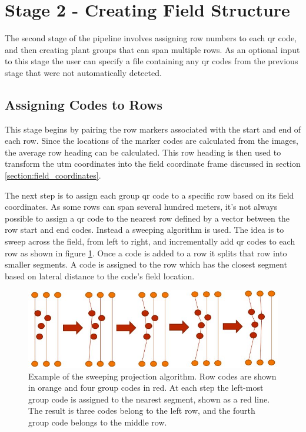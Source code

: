 \section{Stage 2 - Creating Field Structure}
\label{processing-stage2}

The second stage of the pipeline involves assigning row numbers to each \ac{qr} code, and then creating plant groups that can span multiple rows.  As an optional input to this stage the user can specify a file containing any \ac{qr} codes from the previous stage that were not automatically detected.  

\subsection{Assigning Codes to Rows}

This stage begins by pairing the row markers associated with the start and end of each row.  Since the locations of the marker codes are calculated from the images, the average row heading can be calculated.  This row heading is then used to transform the \ac{utm} coordinates into the field coordinate frame discussed in section \ref{section:field_coordinates}.

The next step is to assign each group \ac{qr} code to a specific row based on its field coordinates.  As some rows can span several hundred meters, it's not always possible to assign a \ac{qr} code to the nearest row defined by a vector between the row start and end codes.  Instead a sweeping algorithm is used.   The idea is to sweep across the field, from left to right, and incrementally add \ac{qr} codes to each row as shown in figure \ref{figure:sweeping_algorithm}. Once a code is added to a row it splits that row into smaller segments.  A code is assigned to the row which has the closest segment based on lateral distance to the code's field location. 

\begin{figure}
	\centering
    \includegraphics[width=6in]{figures/sweeping_algorithm.jpg}
    \caption[Sweeping projection algorithm]{Example of the sweeping projection algorithm. Row codes are shown in orange and four group codes in red.  At each step the left-most group code is assigned to the nearest segment, shown as a red line.  The result is three codes belong to the left row, and the fourth group code belongs to the middle row.}
    \label{figure:sweeping_algorithm}
\end{figure}

